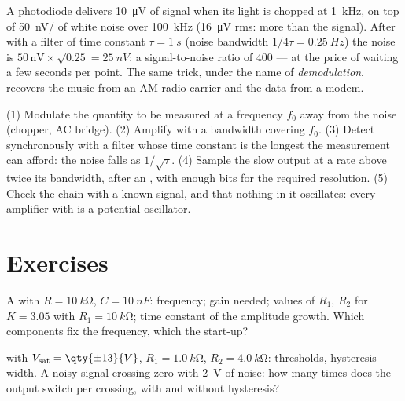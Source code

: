 \begin{example}\label{ex:b2:feedback-oscillators:microvolt}
A photodiode delivers \qty{10}{\micro V} of signal when its light is chopped
at \qty{1}{kHz}, on top of \qty{50}{nV/} of white noise over
\qty{100}{kHz} (\qty{16}{\micro V} rms: more than the signal). After  with a filter of time constant $\tau = \qty{1}{s}$ (noise
bandwidth $1/4\tau = \qty{0.25}{Hz}$) the noise is $50\,\text{nV} \times \sqrt{0.25}
= \qty{25}{nV}$: a signal-to-noise ratio of $400$ --- at the price of
waiting a few seconds per point. The same trick, under the name of
\emph{demodulation}, recovers the music from an AM radio carrier and
the data from a modem.
\end{example}

\begin{method}\label{met:b2:feedback-oscillators:method}
(1) Modulate the quantity to be measured at a frequency $f_0$ away from
the noise (chopper, AC bridge). (2) Amplify with a bandwidth covering
$f_0$. (3) Detect synchronously with a filter whose time constant is
the longest the measurement can afford: the noise falls as
$1/\sqrt\tau$. (4) Sample the slow output at a rate above twice its
bandwidth, after an , with enough bits for the
required resolution. (5) Check the chain with a known signal, and that
nothing in it oscillates: every amplifier with  is a potential
oscillator.
\end{method}

\section{Exercises}

\begin{exercise}[$\star$]\label{exo:b2:feedback-oscillators:1}
A  with $R = \qty{10}{k\ohm}$, $C = \qty{10}{nF}$:
frequency; gain needed; values of $R_1$, $R_2$ for $K = 3.05$ with $R_1 =
\qty{10}{k\ohm}$; time constant of the amplitude growth. Which components
fix the frequency, which the start-up?
\end{exercise}

\begin{exercise}[$\star$]\label{exo:b2:feedback-oscillators:2}
 with $V_{\text{sat}} = \qty{\pm 13}{V}$, $R_1 = \qty{1.0}{k\ohm}$,
$R_2 = \qty{4.0}{k\ohm}$: thresholds, hysteresis width. A noisy signal
crossing zero with \qty{2}{V} of noise: how many times does the output
switch per crossing, with and without hysteresis?
\end{exercise}


